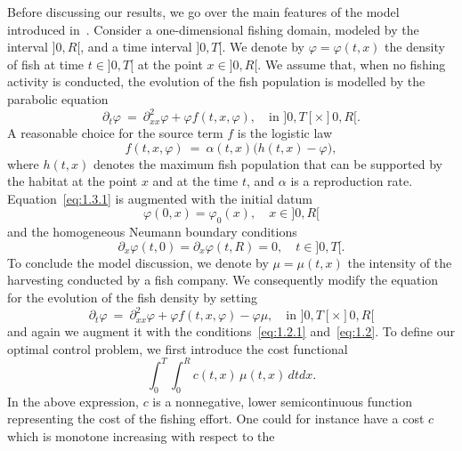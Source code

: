 \documentclass[11pt,leqno]{amsart}
\numberwithin{equation}{section}
\begin{document}
Before discussing our results, we go over the main features of the model introduced in~\cite{BS1}. Consider a one-dimensional fishing domain, modeled by the interval $]0, R[$, and a time interval 
$]0, T[$. We denote by ${\varphi}={\varphi}(t,x)$ the density of fish at time $t \in ]0, T[$ at the point $x \in ]0,R[$. We assume that, when no fishing activity is conducted, the evolution of the fish population is modelled  by the parabolic equation  
\begin{equation*}
{\partial_t}{\varphi}~=~{\partial_{xx}^2}{\varphi}+{\varphi} f(t,x,{\varphi}), \quad \text{in $]0, T[ \times ]0, R[$.}
\end{equation*}
A reasonable choice for the source term $f$ is the logistic law
\begin{equation}
\label{eq:1.3.1}
 f(t,x,{\varphi})~=~\alpha(t,x)\big(h(t,x)-{\varphi} \big),
\end{equation}
where $h(t,x)$ denotes the maximum fish population that can be 
supported by the habitat at the point $x$ and at the time $t$, and $\alpha$ is a 
reproduction rate. Equation~\eqref{eq:1.3.1} is augmented with the initial datum 
\begin{equation}
\label{eq:1.2.1}
{\varphi}(0,x)={\varphi}_0(x), \quad   x \in ]0,R[
\end{equation}
and the homogeneous Neumann boundary conditions 
\begin{equation}
\label{eq:1.2}
{\partial_x } {\varphi}(t,0)={\partial_x }{\varphi}(t,R)=0,\quad  t \in ]0, T[.
\end{equation}
To conclude the model discussion,  
we denote by $\mu=\mu(t,x)$ the intensity of the harvesting 
conducted by a fish company. We consequently modify the equation for the evolution of the fish density by setting 
\begin{equation}
\label{eq:1.6}
{\partial_t}{\varphi}~=~{\partial_{xx}^2}{\varphi}+{\varphi} f(t,x,{\varphi})-{\varphi} \mu, \quad \text{in $]0, T[ \times ]0, R[$}
\end{equation}
and again we augment it with the conditions~\eqref{eq:1.2.1} and~\eqref{eq:1.2}. 
To define our optimal control problem, we first introduce the cost functional 
\begin{equation}
\label{eq:1.7}
\int_0^T \! \! \int_0^R c(t,x) \, \mu(t,x)\,dtdx.
\end{equation}
In the above expression, $c$ is a nonnegative, lower semicontinuous function representing the cost of the fishing effort. One could for instance have a cost $c$ which is monotone increasing with respect to the 
\end{document}
